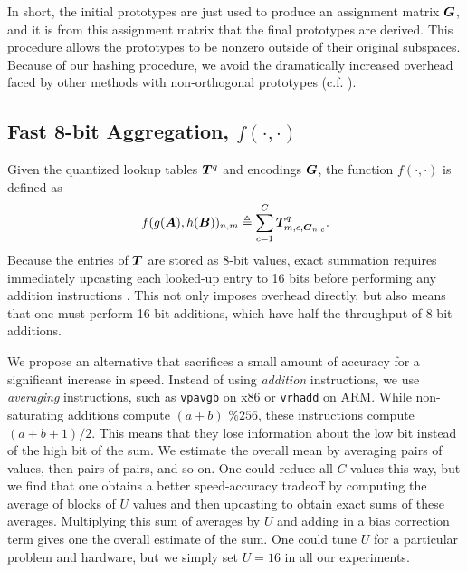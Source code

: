 In short, the initial prototypes are just used to produce an assignment matrix $\bm{G}$, and it is from this assignment matrix that the final prototypes are derived. This procedure allows the prototypes to be nonzero outside of their original subspaces. Because of our hashing procedure, we avoid the dramatically increased overhead faced by other methods with non-orthogonal prototypes (c.f. \cite{otq,aq,cq,grvq,lsq,stackedQuantizers}).

\vspace{-1.5mm}
\subsection{Fast 8-bit Aggregation, $f(\cdot,\cdot)$} \label{sec:aggregate}
\vspace{-.5mm}

Given the quantized lookup tables $\bm{T}^{q}$ and encodings $\bm{G}$, the function $f(\cdot,\cdot)$ is defined as
\begin{align}
    f(g(\bm{A}), h(\bm{B}))_{n,m} \triangleq \sum_{c=1}^C \bm{T}^{q}_{m,c,\bm{G}_{n,c}}.
\end{align}
Because the entries of $\bm{T}$ are stored as 8-bit values, exact summation requires immediately upcasting each looked-up entry to 16 bits before performing any addition instructions \cite{bolt}. This not only imposes overhead directly, but also means that one must perform 16-bit additions, which have half the throughput of 8-bit additions.

We propose an alternative that sacrifices a small amount of accuracy for a significant increase in speed. Instead of using \textit{addition} instructions, we use \textit{averaging} instructions, such as \texttt{vpavgb} on x86 or \texttt{vrhadd} on ARM. While non-saturating additions compute $(a + b) \text{ \% } 256$, these instructions compute $(a + b + 1) / 2$. This means that they lose information about the low bit instead of the high bit of the sum. We estimate the overall mean by averaging pairs of values, then pairs of pairs, and so on. One could reduce all $C$ values this way, but we find that one obtains a better speed-accuracy tradeoff by computing the average of blocks of $U$ values and then upcasting to obtain exact sums of these averages. Multiplying this sum of averages by $U$ and adding in a bias correction term gives one the overall estimate of the sum. One could tune $U$ for a particular problem and hardware, but we simply set $U = 16$ in all our experiments.

